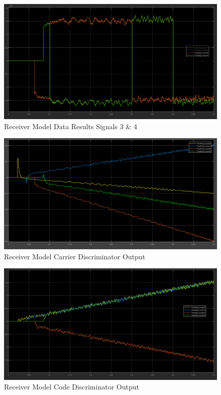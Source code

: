 \documentclass[11pt]{article}
\numberwithin{equation}{subsection}
\begin{document}
	\begin{figure}
		\centering
		\includegraphics[width=\textwidth]{Synth_Test_Data_2}
		\caption{Receiver Model Data Results Signals 3 \& 4}
		\label{RD2}
	\end{figure}	
	\FloatBarrier
	\begin{figure}
		\centering
		\includegraphics[width=\textwidth]{Synth_Test_Carr}
		\caption{Receiver Model Carrier Discriminator Output}
		\label{RCarr}
	\end{figure}	
	
	\begin{figure}
		\centering
		\includegraphics[width=\textwidth]{Synth_Test_Code}
		\caption{Receiver Model Code Discriminator Output}
		\label{RCode}
	\end{figure}	
	
\end{document}
